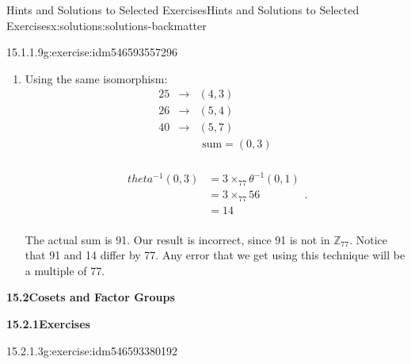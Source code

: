 \documentclass[oneside,10pt,]{book}
\newcommand{\blocktitlefont}{\relax}
\numberwithin{equation}{section}
\begin{document}
\begin{solutions-chapter}{Hints and Solutions to Selected Exercises}{}{Hints and Solutions to Selected Exercises}{}{}{x:solutions:solutions-backmatter}
\begin{divisionsolution}{15.1.1.9}{}{g:exercise:idm546593557296}
\begin{enumerate}[label=(\alph*)]
\begin{equation*}
\begin{split}
& =55 +_{77}70\\
& =48\\
\end{split}\text{.}
\end{equation*}
%
\item{}Using the same isomorphism:%
\begin{equation*}
\begin{array}{ccc}
25 & \to  & (4,3) \\
26 & \to  & (5,4) \\
40 & \to  & (5,7) \\
&   & \textrm{ sum}=(0,3) \\
\end{array}
\end{equation*}
%
\par
%
\begin{equation*}
\begin{split}
theta ^{-1}(0,3) &= 3 \times_{77}\theta ^{-1}(0,1)\\
& = 3\times_{77} 56\\ 
& =14\\
\end{split}\text{.}
\end{equation*}
%
\par
The actual sum is 91. Our result is incorrect, since 91 is not in \(\mathbb{Z}_{77}\).  Notice that 91 and 14 differ by 77. Any error that we get using this technique will be a multiple of 77.%
\end{enumerate}
%
\end{divisionsolution}%
\par\smallskip
\noindent\textbf{\Large{}15.2\space\textperiodcentered\space{}Cosets and Factor Groups}
\par\smallskip
\par\smallskip
\noindent\textbf{\Large{}15.2.1\space\textperiodcentered\space{}Exercises}
\par\smallskip
{}%
\begin{divisionsolution}{15.2.1.3}{}{g:exercise:idm546593380192}%

\end{divisionsolution}
\end{solutions-chapter}
\end{document}
